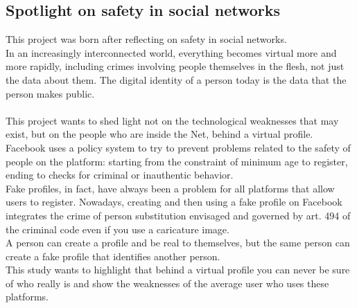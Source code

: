 \subsection{Spotlight on safety in social networks}
This project was born after reflecting on safety in social networks.\\In an increasingly interconnected world, everything becomes virtual more and more rapidly, including crimes involving people themselves in the flesh, not just the data about them. The digital identity of a person today is the data that the person makes public.\\\\
This project wants to shed light not on the technological weaknesses that may exist, but on the people who are inside the Net, behind a virtual profile.\\
Facebook uses a policy system to try to prevent problems related to the safety of people on the platform: starting from the constraint of minimum age to register, ending to checks for criminal or inauthentic behavior.\\
Fake profiles, in fact, have always been a problem for all platforms that allow users to register. Nowadays, creating and then using a fake profile on Facebook integrates the crime of person substitution envisaged and governed by art. 494 of the criminal code even if you use a caricature image.\\
A person can create a profile and be real to themselves, but the same person can create a fake profile that identifies another person.\\
This study wants to highlight that behind a virtual profile you can never be sure of who really is and show the weaknesses of the average user who uses these platforms.
